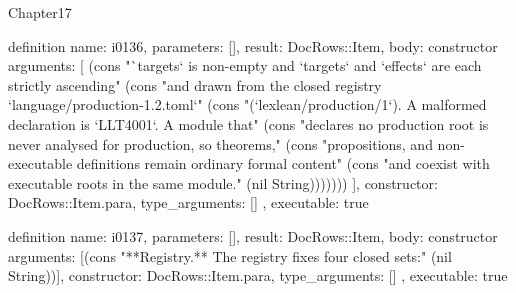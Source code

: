 \begin{lexlean}{Chapter17}
\begin{semanticmodule}
definition{
  name: i0136,
  parameters: [],
  result: DocRows::Item,
  body: constructor{
    arguments: [
      (cons "`targets` is non-empty and `targets` and `effects` are each strictly ascending" (cons "and drawn from the closed registry `language/production-1.2.toml`" (cons "(`lexlean/production/1`). A malformed declaration is `LLT4001`. A module that" (cons "declares no production root is never analysed for production, so theorems," (cons "propositions, and non-executable definitions remain ordinary formal content" (cons "and coexist with executable roots in the same module." (nil String)))))))
    ],
    constructor: DocRows::Item.para,
    type_arguments: []
  },
  executable: true
}

definition{
  name: i0137,
  parameters: [],
  result: DocRows::Item,
  body: constructor{
    arguments: [(cons "**Registry.** The registry fixes four closed sets:" (nil String))],
    constructor: DocRows::Item.para,
    type_arguments: []
  },
  executable: true
}


\end{semanticmodule}
\end{lexlean}
